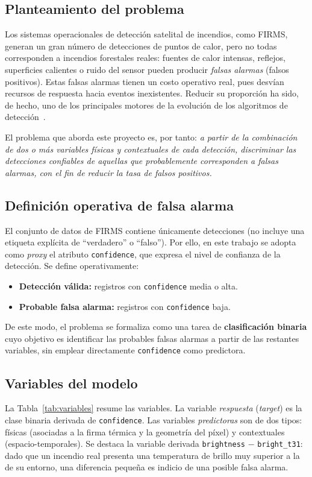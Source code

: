 \subsection{Planteamiento del problema}
Los sistemas operacionales de detección satelital de incendios, como FIRMS, generan un gran número de detecciones de puntos de calor, pero no todas corresponden a incendios forestales reales: fuentes de calor intensas, reflejos, superficies calientes o ruido del sensor pueden producir \textit{falsas alarmas} (falsos positivos). Estas falsas alarmas tienen un costo operativo real, pues desvían recursos de respuesta hacia eventos inexistentes. Reducir su proporción ha sido, de hecho, uno de los principales motores de la evolución de los algoritmos de detección~\cite{giglio2016}.

El problema que aborda este proyecto es, por tanto: \textit{a partir de la combinación de dos o más variables físicas y contextuales de cada detección, discriminar las detecciones confiables de aquellas que probablemente corresponden a falsas alarmas, con el fin de reducir la tasa de falsos positivos.}

\subsection{Definición operativa de falsa alarma}
El conjunto de datos de FIRMS contiene únicamente detecciones (no incluye una etiqueta explícita de ``verdadero'' o ``falso''). Por ello, en este trabajo se adopta como \textit{proxy} el atributo \texttt{confidence}, que expresa el nivel de confianza de la detección. Se define operativamente:
\begin{itemize}
\item \textbf{Detección válida:} registros con \texttt{confidence} media o alta.
\item \textbf{Probable falsa alarma:} registros con \texttt{confidence} baja.
\end{itemize}
De este modo, el problema se formaliza como una tarea de \textbf{clasificación binaria} cuyo objetivo es identificar las probables falsas alarmas a partir de las restantes variables, sin emplear directamente \texttt{confidence} como predictora.

\subsection{Variables del modelo}
La Tabla~\ref{tab:variables} resume las variables. La variable \textit{respuesta} (\textit{target}) es la clase binaria derivada de \texttt{confidence}. Las variables \textit{predictoras} son de dos tipos: físicas (asociadas a la firma térmica y la geometría del píxel) y contextuales (espacio-temporales). Se destaca la variable derivada \texttt{brightness} $-$ \texttt{bright\_t31}: dado que un incendio real presenta una temperatura de brillo muy superior a la de su entorno, una diferencia pequeña es indicio de una posible falsa alarma.

